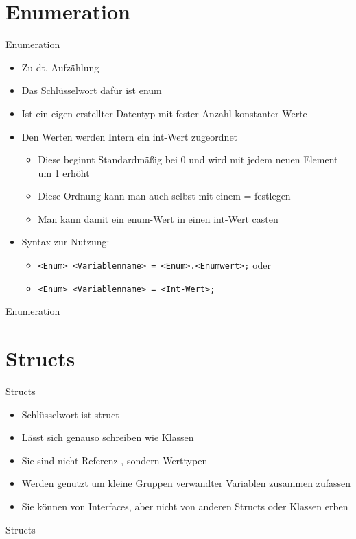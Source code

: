 \section{Enumeration}
\begin{frame}{Enumeration}
	\begin{itemize}
		\item Zu dt. Aufzählung
		\item Das Schlüsselwort dafür ist \alert{enum}
		\item Ist ein eigen erstellter Datentyp mit fester Anzahl konstanter Werte
		\item Den Werten werden Intern ein \alert{int}-Wert zugeordnet
		\begin{itemize}
			\item Diese beginnt Standardmäßig bei 0 und wird mit jedem neuen Element um 1 erhöht
			\item Diese Ordnung kann man auch selbst mit einem \alert{=} festlegen
			\item Man kann damit ein \alert{enum}-Wert in einen \alert{int}-Wert casten			
		\end{itemize}
		\item Syntax zur Nutzung:
		\begin{itemize}
			\item \texttt{\alert{<Enum> <Variablenname>} = \alert{<Enum>}.\alert{<Enumwert>};} oder
			\item \texttt{\alert{<Enum> <Variablenname>} = \alert{<Int-Wert>};}
		\end{itemize}
	\end{itemize}
\end{frame}

\begin{frame}{Enumeration}
	
	
\end{frame}

\section{Structs}
\begin{frame}{Structs}
	\begin{itemize}
		\item Schlüsselwort ist \alert{struct}
		\item Lässt sich genauso schreiben wie Klassen
		\item Sie sind nicht Referenz-, sondern Werttypen
		\item Werden genutzt um kleine Gruppen verwandter Variablen zusammen zufassen
		\item Sie können von Interfaces, aber nicht von anderen Structs oder Klassen erben 
	\end{itemize}
\end{frame}

\begin{frame}{Structs}
	
	
\end{frame}


